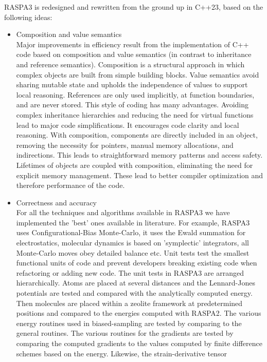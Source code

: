 RASPA3 is redesigned and rewritten from the ground up in C++23, based on the following ideas:
\begin{itemize}
  \item{Composition and value semantics}\\
  Major improvements in efficiency result from the implementation of C++ code based on composition 
  and value semantics (in contrast to inheritance and reference semantics). Composition is a structural 
  approach in which complex objects are built from simple building blocks. Value semantics avoid 
  sharing mutable state and upholds the independence of values to support local reasoning. 
  References are only used implicitly,  at function boundaries, and are never stored. 
  This style of coding has many advantages. Avoiding complex inheritance hierarchies and reducing the 
  need for virtual functions lead to major code simplifications. It encourages code clarity and 
  local reasoning. With composition, components are directly included in an object, removing the 
  necessity for pointers, manual memory allocations, and indirections. This leads to straightforward 
  memory patterns and access safety. Lifetimes of objects are coupled with composition, eliminating the 
  need for explicit memory management. These lead to better compiler optimization and therefore performance of the code.
  \item{Correctness and accuracy}\\
  For all the techniques and algorithms available in RASPA3 we have implemented the 'best' ones available in literature. 
  For example, RASPA3 uses Configurational-Bias Monte-Carlo, it uses the Ewald summation for electrostatics,
  molecular dynamics is based on 'symplectic' integrators, all Monte-Carlo moves obey detailed balance etc.
  Unit tests test the smallest functional units of code and prevent developers breaking existing code when 
  refactoring or adding new code.
  The unit tests in RASPA3 are arranged hierarchically. Atoms are placed at several distances and the 
  Lennard-Jones potentials are tested and compared with the analytically computed energy. 
  Then molecules are placed within a zeolite framework at predetermined positions and compared to the 
  energies computed with RASPA2.
  The various energy routines used in biased-sampling are tested by comparing to the general routines.
  The various routines for the gradients are tested by comparing the computed gradients to the values 
  computed by finite difference schemes based on the energy. Likewise, the strain-derivative tensor 

\end{itemize}
